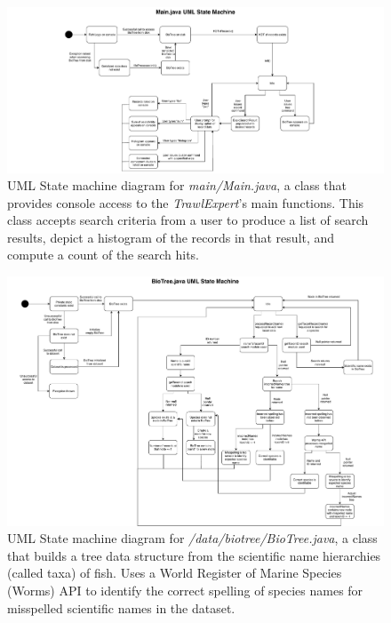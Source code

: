 \documentclass{article}
\begin{document}

\begin{figure}[H]
\includegraphics[width=18cm, trim={6cm 0 6cm 0}, clip]{MainDotJava.pdf}

\caption{UML State machine diagram for \textit{main/Main.java}, a class that provides console access to the \textit{TrawlExpert}'s main functions. This class accepts search criteria from a user to produce a list of search results, depict a histogram of the records in that result, and compute a count of the search hits.}
\label{fig:MainUML}
\end{figure}

\begin{figure}[H]
\centering
\includegraphics[width=18cm, trim={0 0 0 0}, clip]{BioTreeDotJava.pdf}

\caption{UML State machine diagram for \textit{/data/biotree/BioTree.java}, a class that builds a tree data structure from the scientific name hierarchies (called taxa) of fish. Uses a World Register of Marine Species (Worms) API to identify the correct spelling of species names for misspelled scientific names in the dataset. }
\label{fig:BioTreeUML}
\end{figure}
\end{document}
